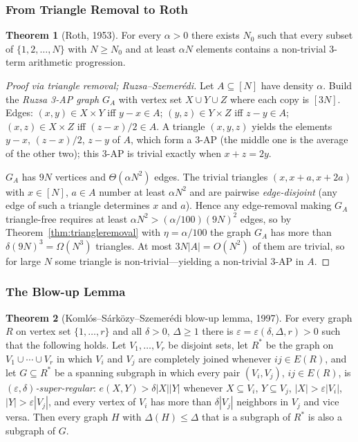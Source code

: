 \documentclass{article}
\theoremstyle{definition}
\newtheorem{theorem}{Theorem}
\begin{document}
\subsubsection{From Triangle Removal to Roth}

\begin{theorem}[Roth, 1953]\label{thm:roth}
For every $\alpha > 0$ there exists $N_0$ such that every subset of
$\{1, 2, \dots, N\}$ with $N \ge N_0$ and at least $\alpha N$
elements contains a non-trivial $3$-term arithmetic progression.
\end{theorem}

\begin{proof}[Proof via triangle removal; Ruzsa--Szemer\'edi]
Let $A \subseteq [N]$ have density $\alpha$. Build the \emph{Ruzsa
3-AP graph} $G_A$ with vertex set $X \cup Y \cup Z$ where each copy
is $[3N]$. Edges: $(x, y) \in X \times Y$ iff $y - x \in A$;
$(y, z) \in Y \times Z$ iff $z - y \in A$; $(x, z) \in X \times Z$
iff $(z - x)/2 \in A$. A triangle $(x, y, z)$ yields the elements
$y - x$, $(z - x)/2$, $z - y$ of $A$, which form a $3$-AP (the middle
one is the average of the other two); this $3$-AP is trivial exactly
when $x + z = 2y$.

$G_A$ has $9N$ vertices and $\Theta(\alpha N^2)$ edges. The trivial
triangles $(x, x + a, x + 2a)$ with $x \in [N]$, $a \in A$ number at
least $\alpha N^2$ and are pairwise \emph{edge-disjoint} (any edge of such
a triangle determines $x$ and $a$). Hence any edge-removal making $G_A$
triangle-free requires at least $\alpha N^2 > (\alpha/100)(9N)^2$ edges, so
by Theorem~\ref{thm:triangleremoval} with $\eta = \alpha/100$ the graph $G_A$
has more than $\delta (9N)^3 = \Omega(N^3)$ triangles.
At most $3N|A| = O(N^2)$ of them are trivial, so for large $N$ some
triangle is non-trivial---yielding a non-trivial 3-AP in $A$.
\end{proof}

\subsubsection{The Blow-up Lemma}

\begin{theorem}[Koml\'os--S\'ark\"ozy--Szemer\'edi blow-up lemma, 1997]
For every graph $R$ on vertex set $\{1, \dots, r\}$ and all $\delta > 0$,
$\Delta \ge 1$ there is $\varepsilon = \varepsilon(\delta, \Delta, r) > 0$ such
that the following holds. Let $V_1, \dots, V_r$ be disjoint sets, let $R^{\ast}$
be the graph on $V_1 \cup \cdots \cup V_r$ in which $V_i$ and $V_j$ are completely
joined whenever $ij \in E(R)$, and let $G \subseteq R^{\ast}$ be a spanning
subgraph in which every pair $(V_i, V_j)$, $ij \in E(R)$, is
\emph{$(\varepsilon, \delta)$-super-regular}: $e(X, Y) > \delta|X||Y|$ whenever
$X \subseteq V_i$, $Y \subseteq V_j$, $|X| > \varepsilon|V_i|$, $|Y| > \varepsilon|V_j|$,
and every vertex of $V_i$ has more than $\delta|V_j|$ neighbors in $V_j$ and
vice versa. Then every graph $H$ with $\Delta(H) \le \Delta$ that is a
subgraph of $R^{\ast}$ is also a subgraph of $G$.
\end{theorem}
\end{document}
